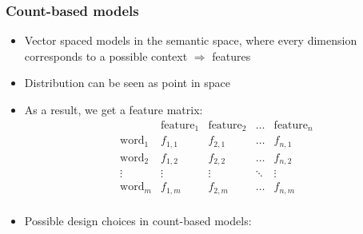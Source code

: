 \subsubsection{Count-based models}
\begin{itemize}
	\item Vector spaced models in the semantic space, where every dimension corresponds to a possible context $\Rightarrow$ features
	\item Distribution can be seen as point in space
	\item As a result, we get a feature matrix:
	$$\begin{array}{c|cccc}
	& \text{feature}_1 & \text{feature}_2 & \dots & \text{feature}_n\\
	\hline
	\text{word}_1  & f_{1,1} & f_{2,1} & \dots & f_{n,1}\\
	\text{word}_2  & f_{1,2} & f_{2,2} & \dots & f_{n,2}\\
	\vdots  & \vdots & \vdots & \ddots & \vdots\\
	\text{word}_m  & f_{1,m} & f_{2,m} & \dots & f_{n,m}\\
	\end{array}$$
	\item Possible design choices in count-based models:
\end{itemize}
